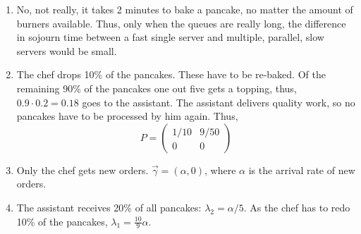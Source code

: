 \begin{question}[use=false]
    \begin{solution}
      \begin{enumerate}
      \item 
      No, not really, it takes 2 minutes to bake a pancake, no matter
      the amount of burners available.  Thus, only when the queues are
      really long, the difference in sojourn time between a fast single server and multiple, parallel, slow servers would be small. 
    \item   The chef drops 10\% of the pancakes. These have to be re-baked. Of
  the remaining 90\% of the pancakes one out five gets a topping,
  thus, $0.9\cdot0.2=0.18$ goes to the assistant. The assistant
  delivers quality work, so no pancakes have to be processed by him
  again. Thus,
\begin{equation*} 
P=
  \begin{pmatrix}
    1/10 & 9/50 \\
0 & 0
  \end{pmatrix}
\end{equation*}
\item Only the chef gets new orders.  $\vec \gamma = (\alpha, 0)$,
where  $\alpha$ is the arrival rate of new orders.
\item The assistant receives
  20\% of all pancakes: $\lambda_2 = \alpha/5$.  As the chef has to
  redo 10\% of the pancakes, $\lambda_1 = \frac{10}{9}\alpha$.


\end{enumerate}
\end{solution}
\end{question}
